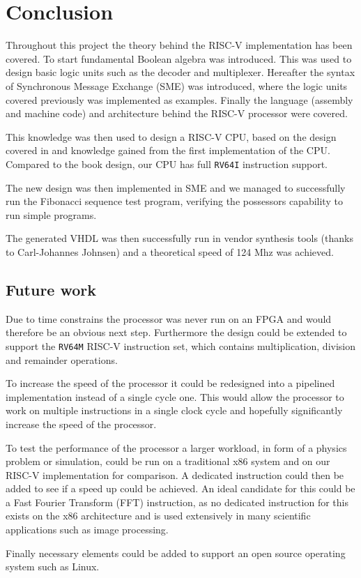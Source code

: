 \chapter{Conclusion}
    Throughout this project the theory behind the RISC-V implementation has been covered. To start fundamental Boolean algebra was introduced. This was used to design basic logic units such as the decoder and multiplexer. Hereafter the syntax of Synchronous Message Exchange (SME) was introduced, where the logic units covered previously was implemented as examples.
    Finally the language (assembly and machine code) and architecture behind the RISC-V processor were covered.
    
    
    This knowledge was then used to design a RISC-V CPU, based on the design covered in \cite{riscVbook} and knowledge gained from the first implementation of the CPU.  
    Compared to the book design, our CPU has full \texttt{RV64I} instruction support.
    
    The new design was then implemented in SME and we managed to successfully run the Fibonacci sequence test program, verifying the possessors capability to run simple programs. 
    
    The generated VHDL was then successfully run in vendor synthesis tools (thanks to Carl-Johannes Johnsen) and a theoretical speed of 124 Mhz was achieved.   
    
    \section{Future work}

    Due to time constrains the processor was never run on an FPGA and would therefore be an obvious next step. Furthermore the design could be extended to support the \texttt{RV64M} RISC-V instruction set, which contains multiplication, division and remainder operations.
    
    To increase the speed of the processor it could be redesigned into a pipelined implementation instead of a single cycle one. This would allow the processor to work on multiple instructions in a single clock cycle and hopefully significantly increase the speed of the processor.
    
    To test the performance of the processor a larger workload, in form of a physics problem or simulation, could be run on a traditional x86 system and on our RISC-V implementation for comparison. A dedicated instruction could then be added to see if a speed up could be achieved. An ideal candidate for this could be a Fast Fourier Transform (FFT) instruction, as no dedicated instruction for this exists on the x86 architecture and is used extensively in many scientific applications such as image processing.
    
    Finally necessary elements could be added to support an open source operating system such as Linux.

